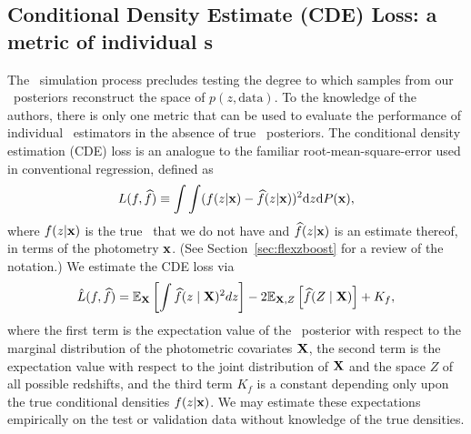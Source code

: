 
\subsection{Conditional Density Estimate (CDE) Loss: a metric of individual \pzpdf s}
\label{sec:CDE_loss}

The \buzz\ simulation process precludes testing the degree to which samples from our \pz\ posteriors reconstruct the space of $p(z, \mathrm{data})$.
To the knowledge of the authors, there is only one metric that can be used to evaluate the performance of individual \pzpdf\ estimators in the absence of true \pz\ posteriors.
The conditional density estimation (CDE) loss is an analogue to the familiar root-mean-square-error used in conventional regression, defined as
\begin{equation}
  \label{eq:cde-loss}
  L(f, \widehat{f}) \equiv \int \int (f(z \vert {\mathbf{x}}) - \widehat{f}(z \vert {\mathbf{x}}))^{2} \mathrm{d}z \mathrm{d}P({\mathbf{x}}) ,
\end{equation}
where $f(z \vert {\mathbf{x}})$ is the true \pzpdf\ that we do not have and $\widehat{f}(z \vert {\mathbf{x}})$ is an estimate thereof, in terms of the photometry ${\mathbf{x}}$.
(See Section~\ref{sec:flexzboost} for a review of the notation.)
We estimate the CDE loss via
\begin{equation}
  \label{eq:estimated-cde-loss}
  \hat{L}(f, \widehat{f}) = \mathbb{E}_{\mathbf{X}} \left[\int \widehat{f}(z \mid {\mathbf{X}})^{2} dz\right] - 2 \mathbb{E}_{{\mathbf{X}}, Z}\left[\widehat{f}(Z \mid {\mathbf{X}})\right] + K_{f},
\end{equation}
where the first term is the expectation value of the \pz\ posterior with respect to the marginal distribution of the photometric covariates ${\mathbf{X}}$, the second term is the expectation value with respect to the joint distribution of ${\mathbf{X}}$ and the space $Z$ of all possible redshifts, and the third term $K_{f}$ is a constant depending only upon the true conditional densities $f(z \vert {\mathbf{x}})$.
We may estimate these expectations empirically on the test or validation data \citep[Eq.~7 in][]{Izbicki:17b} without knowledge of the true densities.
